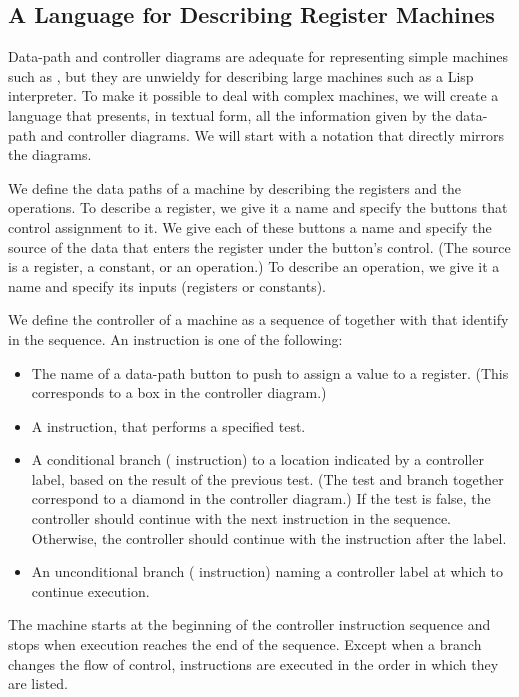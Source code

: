 \subsection{A Language for Describing Register Machines}
\label{Section 5.1.1}

Data-path and controller diagrams are adequate for representing simple machines such as , but they are unwieldy for describing large machines such as a Lisp interpreter.
To make it possible to deal with complex machines, we will create a language that presents, in textual form, all the information given by the data-path and controller diagrams.
We will start with a notation that directly mirrors the diagrams.

We define the data paths of a machine by describing the registers and the operations.
To describe a register, we give it a name and specify the buttons that control assignment to it.
We give each of these buttons a name and specify the source of the data that enters the register under the button’s control.
(The source is a register, a constant, or an operation.)
To describe an operation, we give it a name and specify its inputs (registers or  constants).

We define the controller of a machine as a sequence of  together with  that identify  in the sequence.
An instruction is one of the following:
\begin{itemize}

	\item
		The name of a data-path button to push to assign a value to a register.
		(This corresponds to a box in the controller diagram.)

	\item
		A  instruction, that performs a specified test.

	\item
		A conditional branch ( instruction) to a location indicated by a controller label, based on the result of the previous test.
		(The test and branch together correspond to a diamond in the controller diagram.)
		If the test is false, the controller should continue with the next instruction in the sequence.
		Otherwise, the controller should continue with the instruction after the label.

	\item
		An unconditional branch ( instruction) naming a controller label at which to continue execution.

\end{itemize}
The machine starts at the beginning of the controller instruction sequence and stops when execution reaches the end of the sequence.
Except when a branch changes the flow of control, instructions are executed in the order in which they are listed.



